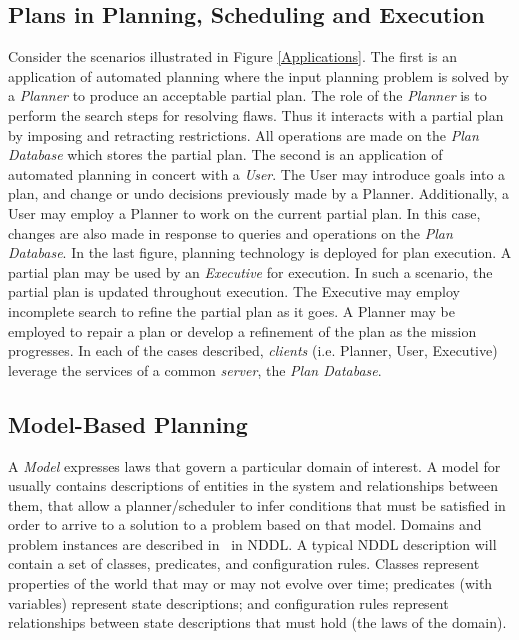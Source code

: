 \documentclass[10pt, letterpaper, twoside]{article}
\begin{document}
\subsection{Plans in Planning, Scheduling and Execution}
Consider the scenarios illustrated in Figure \ref{Applications}. The first
is an application of automated planning where the input planning problem is
solved by a {\em Planner} to produce an acceptable partial plan. The role
of the {\em Planner} is to perform the search steps for resolving
flaws. Thus it interacts with a partial plan by imposing and retracting
restrictions. All operations are made on the {\em Plan Database} which
stores the partial plan.  The second is an application of automated
planning in concert with a {\em User}. The User may introduce goals into a
plan, and change or undo decisions previously made by a
Planner. Additionally, a User may employ a Planner to work on the current
partial plan.  In this case, changes are also made in response to queries
and operations on the {\em Plan Database}.  In the last figure, planning
technology is deployed for plan execution. A partial plan may be used by an
{\em Executive} for execution. In such a scenario, the partial plan is
updated throughout execution. The Executive may employ incomplete search to
refine the partial plan as it goes. A Planner may be employed to repair a
plan or develop a refinement of the plan as the mission progresses. In each
of the cases described, {\em clients} (i.e. Planner, User, Executive)
leverage the services of a common {\em server}, the {\em Plan Database}.
\begin{figure*}[t]
\centering{}
\caption{Sample Plan Database Applications}
\label{Applications}
\end{figure*}

\subsection{Model-Based Planning}
A {\em Model} expresses laws that govern a particular domain of interest.
A model for \ET\, usually contains descriptions of entities in the system
and relationships between them, that allow a planner/scheduler to infer
conditions that must be satisfied in order to arrive to a solution to a
problem based on that model.  Domains and problem instances are
described in \ET\, in NDDL.  A typical NDDL description will contain a set
of classes, predicates, and configuration rules.  Classes represent
properties of the world that may or may not evolve over time; predicates
(with variables) represent state descriptions; and configuration rules
represent relationships between state descriptions that must hold (the laws
of the domain). 
\end{document}
